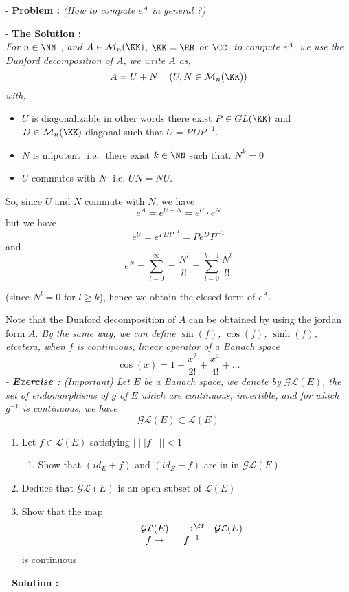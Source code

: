 
%

\lecday[2025-03-18]

% 

- \textbf{Problem :} \it (How to compute $e^{A} $ in general ?) 


- \textbf{The Solution :} \it \\
For $n \in \NN $ , and $A  \in \mathcal{M} _{n}(\KK) $, 
$\KK = \RR  $ or $\CC  $, to compute $e^{A} $, we use
the Dunford decomposition of $A$, we write $A$ as, 
\[
A = U + N  \quad  \left( U,N \in \mathcal{M} _{n}(\KK)  \right)
\]
with, 
\begin{itemize}
	\item $U$ is diagonalizable in other words
		there exist $P \in GL(\KK)   $  and 
		$D \in \mathcal{M} _{n}(\KK)  $  diagonal
		such that  $U = PDP ^{-1} $.
	\item  $N $ is nilpotent 
		$\text{ i.e. } $  there exist $k \in \NN $ 
		such that.
		$N^{k}= 0$ 
	\item $U $ commutes with $N $ $\text{ i.e. } UN = NU $.  
\end{itemize}
So, since $U $ and $N $ commute with $N $, we have 
\[
	e^{A} = e^{U+N} = e^{U} \cdot e^{N}
\]
but we have 
\[
e^{U} = e^{P D P ^{-1}} = P e^{D} P ^{-1}
\]
and \[
e^{N} = \sum_{l=0}^{\infty } = \frac{N^{l}}{l!} = 
\sum_{l=0}^{k-1} \frac{N^{l}}{l !}
\]

(since $N ^{l} = 0 $ for $l \geq k $), 
hence we obtain the closed form of $e^{A}$. 

Note that the Dunford decomposition of $A $ can be obtained
by using the jordan form $A$.
\divider
\it By the same way, we can define $\sin{(f) } $,
$\cos{(f) }$, $\sinh{(f) } $, etcetera, when $f $ is 
continuous, linear operator of a Banach space 
\[
\cos{(x) } = 
1 - \frac{x^2 }{2 !} + \frac{x^{4}}{4!} + \hdots 
\]
\divider
- \textbf{Exercise : } \it (Important)
Let $E $ be a Banach space, we denote by 
$\mathcal{G} \mathcal{L} (E)  $, the set of endomorphisms of
$g $ of $E $ which are continuous, invertible, and for which
$g^{-1} $ is continuous, we have 
\[
\mathcal{G} \mathcal{L} (E)  \subset \mathcal{L} (E) 
\]
\begin{enumerate}[(1)]
\item Let $f \in \mathcal{L} (E)  $ satisfying $\mid \mid \mid  f \mid \mid \mid  < 1$
\begin{enumerate}
\item Show that $\left( id_{E} + f \right) $ and 
	$\left( id_{E} - f \right) $  are in 
	in $\mathcal{G} \mathcal{L} (E)  $ 
\end{enumerate}
\item Deduce that $\mathcal{G} \mathcal{L}(E)   $  is an open
	subset of $\mathcal{L} (E)  $ 
\item Show that the map 
	\[
	\begin{array}{cccc}
	        & \mathcal{G}\mathcal{L}(E)       & \longrightarrow
		^{\ff}& \mathcal{G}\mathcal{L}(E)    \\
		      & f  \rightarrow & f^{-1}
	\end{array}
	\]
	is continuous 
\end{enumerate}
- \textbf{Solution :  }   

